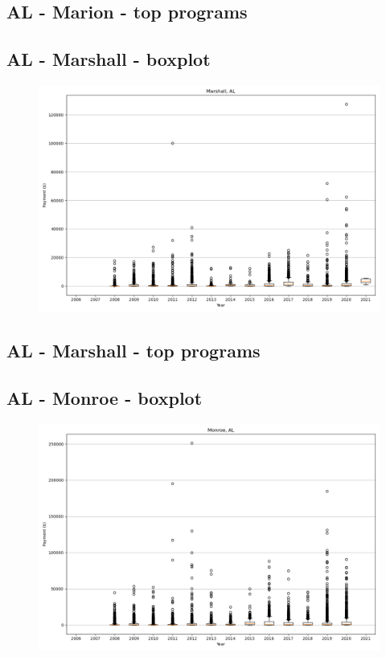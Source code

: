 \subsection*{AL - Marion - top programs}

\newpage
\subsection*{AL - Marshall - boxplot}
\begin{figure}[h]
\centering
\includegraphics[width=7in]{../output/boxplots/counties/Marshall-AL_boxplot.png}
\end{figure}


\subsection*{AL - Marshall - top programs}

\newpage
\subsection*{AL - Monroe - boxplot}
\begin{figure}[h]
\centering
\includegraphics[width=7in]{../output/boxplots/counties/Monroe-AL_boxplot.png}
\end{figure}


